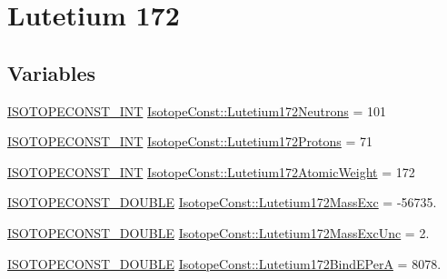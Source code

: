 \hypertarget{group___isotope_const-_lutetium-_lu172}{}\section{Lutetium 172}
\label{group___isotope_const-_lutetium-_lu172}
\subsection*{Variables}
\begin{DoxyCompactItemize}
\item 
\mbox{\hyperlink{group___isotope_const-_macros_ga5f18360b3e99483a35c32d789e62621c}{I\+S\+O\+T\+O\+P\+E\+C\+O\+N\+S\+T\+\_\+\+I\+NT}} \mbox{\hyperlink{group___isotope_const-_lutetium-_lu172_ga5e69092ba5f09c68811864db3c079998}{Isotope\+Const\+::\+Lutetium172\+Neutrons}} = 101
\item 
\mbox{\hyperlink{group___isotope_const-_macros_ga5f18360b3e99483a35c32d789e62621c}{I\+S\+O\+T\+O\+P\+E\+C\+O\+N\+S\+T\+\_\+\+I\+NT}} \mbox{\hyperlink{group___isotope_const-_lutetium-_lu172_ga804e5ee51821f8ed73e8e2f75f21f494}{Isotope\+Const\+::\+Lutetium172\+Protons}} = 71
\item 
\mbox{\hyperlink{group___isotope_const-_macros_ga5f18360b3e99483a35c32d789e62621c}{I\+S\+O\+T\+O\+P\+E\+C\+O\+N\+S\+T\+\_\+\+I\+NT}} \mbox{\hyperlink{group___isotope_const-_lutetium-_lu172_ga518c01515ada58ae1400660ccbfc406e}{Isotope\+Const\+::\+Lutetium172\+Atomic\+Weight}} = 172
\item 
\mbox{\hyperlink{group___isotope_const-_macros_ga8f45a7272ce02c0b4c65c44636ed719a}{I\+S\+O\+T\+O\+P\+E\+C\+O\+N\+S\+T\+\_\+\+D\+O\+U\+B\+LE}} \mbox{\hyperlink{group___isotope_const-_lutetium-_lu172_gad14fee4f86682a56d98cc045528087f5}{Isotope\+Const\+::\+Lutetium172\+Mass\+Exc}} = -\/56735.
\item 
\mbox{\hyperlink{group___isotope_const-_macros_ga8f45a7272ce02c0b4c65c44636ed719a}{I\+S\+O\+T\+O\+P\+E\+C\+O\+N\+S\+T\+\_\+\+D\+O\+U\+B\+LE}} \mbox{\hyperlink{group___isotope_const-_lutetium-_lu172_ga68aa66e93b1698b4947193111a68d72f}{Isotope\+Const\+::\+Lutetium172\+Mass\+Exc\+Unc}} = 2.
\item 
\mbox{\hyperlink{group___isotope_const-_macros_ga8f45a7272ce02c0b4c65c44636ed719a}{I\+S\+O\+T\+O\+P\+E\+C\+O\+N\+S\+T\+\_\+\+D\+O\+U\+B\+LE}} \mbox{\hyperlink{group___isotope_const-_lutetium-_lu172_ga6fdfdc7f0e3f34871a30067ed7c8127f}{Isotope\+Const\+::\+Lutetium172\+Bind\+E\+PerA}} = 8078.
\item 

\end{DoxyCompactItemize}
